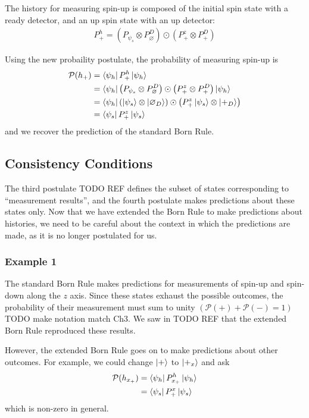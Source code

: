 The history for measuring spin-up is composed of the initial spin state with a ready detector, and an up spin state with an up detector:
\begin{align}
  P^h_+ = \left(P_{\psi_s} \otimes P^D_\varnothing \right) \odot \left(P^z_+ \otimes P^D_+ \right)
\end{align}

Using the new probaility postulate, the probability of measuring spin-up is
\begin{align}
    \mathcal{P}(h_+) &= \bra{\psi_h} P^h_+ \ket{\psi_h} \\ \nonumber
    &= \bra{\psi_h} \left(P_{\psi_s} \otimes P^D_\varnothing \right) \odot \left(P^z_+ \otimes P^D_+ \right) \ket{\psi_h} \\ \nonumber
    &=  \bra{\psi_h}  \left(\ket{\psi_s} \otimes \ket{\varnothing_D} \right)\odot \left(P^z_+\ket{\psi_s} \otimes \ket{+_D} \right) \\ \nonumber
    &= \bra{\psi_s} P^z_+ \ket{\psi_s}
\end{align}
and we recover the prediction of the standard Born Rule.

\subsection{Consistency Conditions}

The third postulate TODO REF defines the subset of states corresponding to ``measurement results'', and the fourth postulate makes predictions about these states only. Now that we have extended the Born Rule to make predictions about histories, we need to be careful about the context in which the predictions are made, as it is no longer postulated for us.

\subsubsection{Example 1}

The standard Born Rule makes predictions for measurements of spin-up and spin-down along the $z$ axis. Since these states exhaust the possible outcomes, the probability of their measurement must sum to unity $\left( \mathcal{P}(+) + \mathcal{P}(-) = 1 \right)$ TODO make notation match Ch3. We saw in TODO REF that the extended Born Rule reproduced these results.

However, the extended Born Rule goes on to make predictions about other outcomes. For example, we could change $\ket{+}$ to $\ket{+_x}$  and ask
\begin{align}
  \mathcal{P}(h_{x_+}) &= \bra{\psi_h} P^h_{x_+} \ket{\psi_h}  \\ \nonumber
  &= \bra{\psi_s} P^x_+ \ket{\psi_s}
\end{align}
which is non-zero in general.

